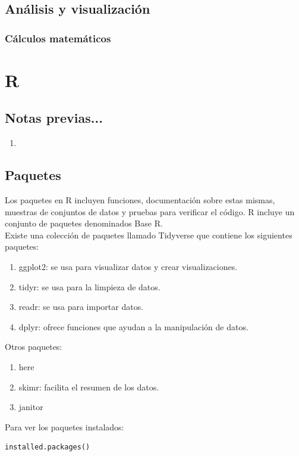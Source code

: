 \documentclass[a4paper, 12pt]{book}
\begin{document}
\section{Análisis y visualización}
\subsection{Cálculos matemáticos}


%
\chapter{R}
\section{Notas previas...}
\begin{enumerate}
\item 
\end{enumerate}
\section{Paquetes}
Los paquetes en R incluyen funciones, documentación sobre estas mismas, muestras de conjuntos de datos y pruebas para verificar el código. R incluye un conjunto de paquetes denominados Base R. \\
Existe una colección de paquetes llamado Tidyverse que contiene los siguientes paquetes:
\begin{enumerate}
\item ggplot2: se usa para visualizar datos y crear visualizaciones.
\item tidyr: se usa para la limpieza de datos.
\item readr: se usa para importar datos.
\item dplyr: ofrece funciones que ayudan a la manipulación de datos.
\end{enumerate}


Otros paquetes:
\begin{enumerate}
\item here
\item skimr: facilita el resumen de los datos.
\item janitor
\end{enumerate}

Para ver los paquetes instalados:
\begin{verbatim}
installed.packages()
\end{verbatim}
\end{document}
